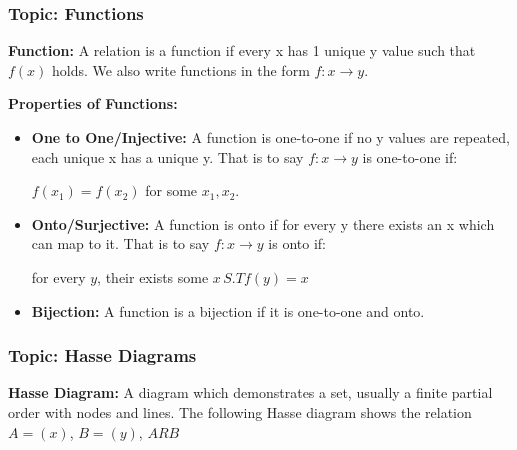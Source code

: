 \documentclass{article}
\begin{document}
\subsubsection{Topic: Functions}
\textbf{Function:} A relation is a function if every x has 1 unique y value such that $f(x)$ holds. We also write functions in the form $f:x \rightarrow y$.
\begin{flushleft}
\textbf{Properties of Functions:} 
\end{flushleft}
\begin{itemize}
\item \textbf{One to One/Injective:}  A function is one-to-one if no y values are repeated, each unique x has a unique y. That is to say $f:x \rightarrow y$ is one-to-one if:
\begin{center}$f(x_{1})=f(x_{2})$ for some $x_{1},x_{2}$.\end{center}

\item \textbf{Onto/Surjective:} A function is onto if for every y there exists an x which can map to it. That is to say $f:x \rightarrow y$ is onto if:

\begin{center} for every $y$, their exists some $x \, S.T f(y) = x$ \end{center}
\item \textbf{Bijection:} A function is a bijection if it is one-to-one and onto.
\end{itemize}
\subsubsection{Topic: Hasse Diagrams}
\textbf{Hasse Diagram:} A diagram which demonstrates a set, usually a finite partial order with nodes and lines. The following Hasse diagram shows the relation $A=(x)$, $B=(y)$, $ARB$
\begin{center} 
\end{center}
\end{document}
